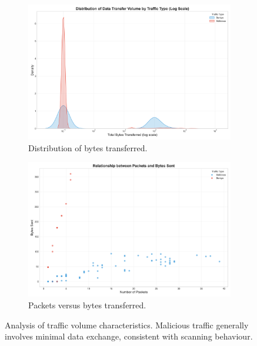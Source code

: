 \begin{figure}[htbp]
    \centering
    \begin{subfigure}[b]{0.48\textwidth}
        \centering
        \includegraphics[width=\textwidth]{figures/bytes_distribution.png}
        \caption{Distribution of bytes transferred.}
        \label{fig:bytes_distribution}
    \end{subfigure}
    \hfill %
    \begin{subfigure}[b]{0.48\textwidth}
        \centering
        \includegraphics[width=\textwidth]{figures/packets_vs_bytes.png}
        \caption{Packets versus bytes transferred.}
        \label{fig:packets_vs_bytes}
    \end{subfigure}
    
    \caption{Analysis of traffic volume characteristics. Malicious traffic generally involves minimal data exchange, consistent with scanning behaviour.}
    \label{fig:traffic_volume_analysis} %
\end{figure}


